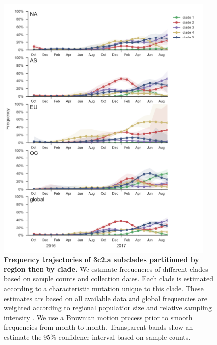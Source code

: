 \documentclass[11pt,oneside,letterpaper]{article}
\begin{document}
\begin{figure}[h!]
  \centering
  \includegraphics[width=0.95\textwidth]{../figures/sep-2017/h3n2_mutations_by_region.png}
  \caption{\textbf{Frequency trajectories of 3c2.a subclades partitioned by region then by clade.}
  We estimate frequencies of different clades based on sample counts and collection dates.
  Each clade is estimated according to a characteristic mutation unique to this clade.
  These estimates are based on all available data and global frequencies are weighted according to regional population size and relative sampling intensity .
  We use a Brownian motion process prior to smooth frequencies from month-to-month.
  Transparent bands show an estimate the 95\% confidence interval based on sample counts.
  }
  \label{h3n2_mutations_by_region}
\end{figure}
\end{document}
